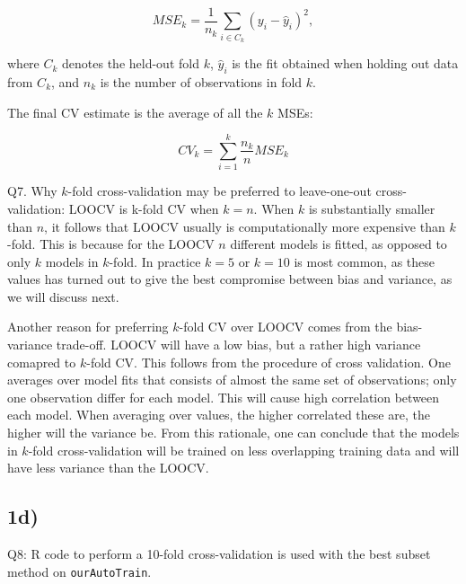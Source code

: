 \documentclass[]{article}
\begin{document}
\[
MSE_k=\frac{1}{n_k}\sum_{i \in C_k}(y_i-\hat y_i)^2,
\]

where \(C_k\) denotes the held-out fold \(k\), \(\hat y_i\) is the fit
obtained when holding out data from \(C_k\), and \(n_k\) is the number
of observations in fold \(k\).

The final CV estimate is the average of all the \(k\) MSEs:

\[
CV_k=\sum_{i=1}^k \frac{n_k}{n}MSE_k
\]

Q7. Why \(k\)-fold cross-validation may be preferred to leave-one-out
cross-validation: LOOCV is k-fold CV when \(k=n\). When \(k\) is
substantially smaller than \(n\), it follows that LOOCV usually is
computationally more expensive than \(k\)-fold. This is because for the
LOOCV \(n\) different models is fitted, as opposed to only \(k\) models
in \(k\)-fold. In practice \(k=5\) or \(k=10\) is most common, as these
values has turned out to give the best compromise between bias and
variance, as we will discuss next.

Another reason for preferring \(k\)-fold CV over LOOCV comes from the
bias-variance trade-off. LOOCV will have a low bias, but a rather high
variance comapred to \(k\)-fold CV. This follows from the procedure of
cross validation. One averages over model fits that consists of almost
the same set of observations; only one observation differ for each
model. This will cause high correlation between each model. When
averaging over values, the higher correlated these are, the higher will
the variance be. From this rationale, one can conclude that the models
in \(k\)-fold cross-validation will be trained on less overlapping
training data and will have less variance than the LOOCV.

\subsection{1d)}\label{d}

Q8: R code to perform a 10-fold cross-validation is used with the best
subset method on \texttt{ourAutoTrain}.
\end{document}
